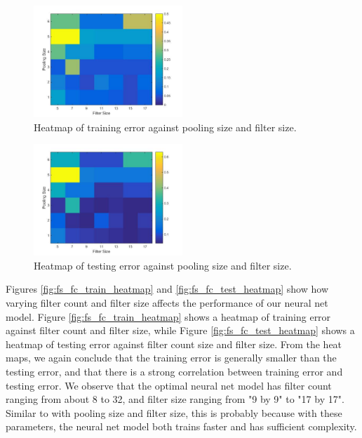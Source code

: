 \documentclass[10pt,twocolumn]{article}
\begin{document}
\begin{figure}
\centering
\includegraphics[width = 0.5\textwidth]{figure/ps_fs_train_heatmap}
\caption{Heatmap of training error against pooling size and filter size.}
\label{fig:ps_fs_train_heatmap}
\end{figure}

\begin{figure}
\centering
\includegraphics[width = 0.5\textwidth]{figure/ps_fs_test_heatmap}
\caption{Heatmap of testing error against pooling size and filter size.}
\label{fig:ps_fs_test_heatmap}
\end{figure}

Figures \ref{fig:fs_fc_train_heatmap} and \ref{fig:fs_fc_test_heatmap} show how varying filter count and filter size affects the performance of our neural net model. Figure \ref{fig:fs_fc_train_heatmap}  shows a heatmap of training error against filter count and filter size, while Figure \ref{fig:fs_fc_test_heatmap} shows a heatmap of testing error against filter count size and filter size. From the heat maps, we again conclude that the training error is generally smaller than the testing error, and that there is a strong correlation between training error and testing error. We observe that the optimal neural net model has filter count ranging from about 8 to 32, and filter size ranging from "9 by 9" to "17 by 17". Similar to with pooling size and filter size, this is probably because with these parameters, the neural net model both trains faster and has sufficient complexity.
\end{document}
